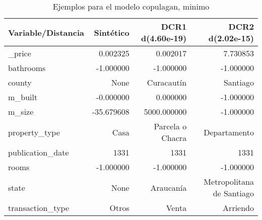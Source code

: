 \begin{table}[H]
\centering
\fontsize{10}{14}\selectfont
\caption{Ejemplos para el modelo copulagan, minimo}
\label{table-example-economicos-b-1-copulagan-min}
\begin{tabular}{|l|r|r|r|}
\hline
\rowcolor[gray]{0.8}
Variable/Distancia & Sintético & DCR1 d(4.60e-19) & DCR2 d(2.02e-15) \\
\hline \_price & \cellcolor[rgb]{0.9, 0.54, 0.52} 0.002325 & \cellcolor[rgb]{0.9, 0.54, 0.52} 0.002017 & 7.730853 \\
\hline bathrooms & \cellcolor[rgb]{0.9, 0.54, 0.52} -1.000000 & \cellcolor[rgb]{0.9, 0.54, 0.52} -1.000000 & \cellcolor[rgb]{0.9, 0.54, 0.52} -1.000000 \\
\hline county & \cellcolor[rgb]{0.9, 0.54, 0.52} None & Curacautín & Santiago \\
\hline m\_built & \cellcolor[rgb]{0.9, 0.54, 0.52} -0.000000 & \cellcolor[rgb]{0.9, 0.54, 0.52} 0.000000 & \cellcolor[rgb]{0.9, 0.54, 0.52} -1.000000 \\
\hline m\_size & \cellcolor[rgb]{0.9, 0.54, 0.52} -35.679608 & 5000.000000 & \cellcolor[rgb]{0.9, 0.54, 0.52} -1.000000 \\
\hline property\_type & \cellcolor[rgb]{0.9, 0.54, 0.52} Casa & Parcela o Chacra & Departamento \\
\hline publication\_date & \cellcolor[rgb]{0.9, 0.54, 0.52} 1331 & \cellcolor[rgb]{0.9, 0.54, 0.52} 1331 & \cellcolor[rgb]{0.9, 0.54, 0.52} 1331 \\
\hline rooms & \cellcolor[rgb]{0.9, 0.54, 0.52} -1.000000 & \cellcolor[rgb]{0.9, 0.54, 0.52} -1.000000 & \cellcolor[rgb]{0.9, 0.54, 0.52} -1.000000 \\
\hline state & \cellcolor[rgb]{0.9, 0.54, 0.52} None & Araucanía & Metropolitana de Santiago \\
\hline transaction\_type & \cellcolor[rgb]{0.9, 0.54, 0.52} Otros & Venta & Arriendo \\
\hline
\end{tabular}
\end{table}
